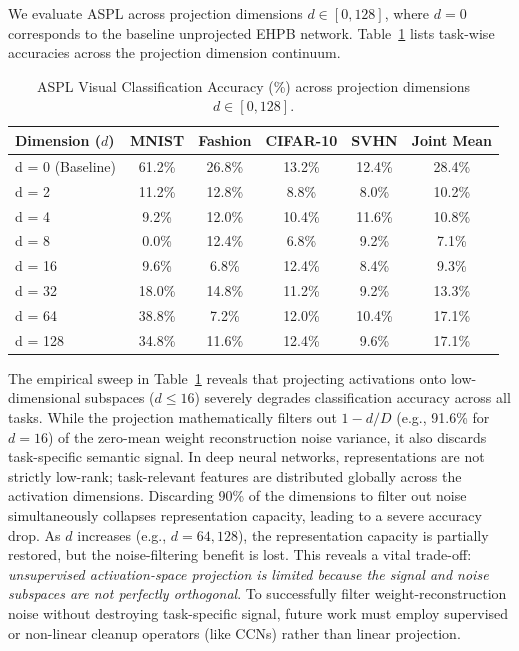 We evaluate ASPL across projection dimensions $d \in [0, 128]$, where $d=0$ corresponds to the baseline unprojected EHPB network. Table~\ref{tab:aspl_sweep} lists task-wise accuracies across the projection dimension continuum.

\begin{table}[h]
\caption{ASPL Visual Classification Accuracy (\%) across projection dimensions $d \in [0, 128]$.}
\label{tab:aspl_sweep}
\vskip 0.15in
\begin{center}
\begin{small}
\begin{sc}
\begin{tabular}{lccccc}
\toprule
Dimension ($d$) & MNIST & Fashion & CIFAR-10 & SVHN & Joint Mean \\
\midrule
d = 0 (Baseline) & 61.2\% & 26.8\% & 13.2\% & 12.4\% & 28.4\% \\
d = 2 & 11.2\% & 12.8\% & 8.8\% & 8.0\% & 10.2\% \\
d = 4 & 9.2\% & 12.0\% & 10.4\% & 11.6\% & 10.8\% \\
d = 8 & 0.0\% & 12.4\% & 6.8\% & 9.2\% & 7.1\% \\
d = 16 & 9.6\% & 6.8\% & 12.4\% & 8.4\% & 9.3\% \\
d = 32 & 18.0\% & 14.8\% & 11.2\% & 9.2\% & 13.3\% \\
d = 64 & 38.8\% & 7.2\% & 12.0\% & 10.4\% & 17.1\% \\
d = 128 & 34.8\% & 11.6\% & 12.4\% & 9.6\% & 17.1\% \\
\bottomrule
\end{tabular}
\end{sc}
\end{small}
\end{center}
\vskip -0.1in
\end{table}

The empirical sweep in Table~\ref{tab:aspl_sweep} reveals that projecting activations onto low-dimensional subspaces ($d \le 16$) severely degrades classification accuracy across all tasks. While the projection mathematically filters out $1 - d/D$ (e.g., 91.6\% for $d=16$) of the zero-mean weight reconstruction noise variance, it also discards task-specific semantic signal. In deep neural networks, representations are not strictly low-rank; task-relevant features are distributed globally across the activation dimensions. Discarding 90\% of the dimensions to filter out noise simultaneously collapses representation capacity, leading to a severe accuracy drop. As $d$ increases (e.g., $d=64, 128$), the representation capacity is partially restored, but the noise-filtering benefit is lost. This reveals a vital trade-off: \textit{unsupervised activation-space projection is limited because the signal and noise subspaces are not perfectly orthogonal}. To successfully filter weight-reconstruction noise without destroying task-specific signal, future work must employ supervised or non-linear cleanup operators (like CCNs) rather than linear projection.


